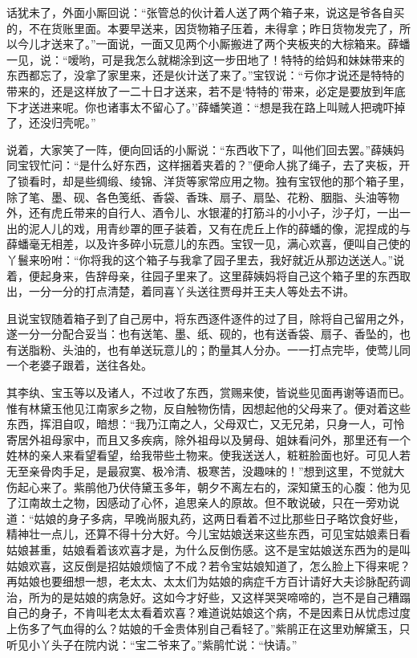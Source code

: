话犹未了，外面小厮回说：``张管总的伙计着人送了两个箱子来，说这是爷各自买的，不在货账里面。本要早送来，因货物箱子压着，未得拿；昨日货物发完了，所以今儿才送来了。''一面说，一面又见两个小厮搬进了两个夹板夹的大棕箱来。薛蟠一见，说：``嗳哟，可是我怎么就糊涂到这一步田地了！特特的给妈和妹妹带来的东西都忘了，没拿了家里来，还是伙计送了来了。''宝钗说：``亏你才说还是特特的带来的，还是这样放了一二十日才送来，若不是`特特的'带来，必定是要放到年底下才送进来呢。你也诸事太不留心了。''薛蟠笑道：``想是我在路上叫贼人把魂吓掉了，还没归壳呢。''

说着，大家笑了一阵，便向回话的小厮说：``东西收下了，叫他们回去罢。''薛姨妈同宝钗忙问：``是什么好东西，这样捆着夹着的？''便命人挑了绳子，去了夹板，开了锁看时，却是些绸缎、绫锦、洋货等家常应用之物。独有宝钗他的那个箱子里，除了笔、墨、砚、各色笺纸、香袋、香珠、扇子、扇坠、花粉、胭脂、头油等物外，还有虎丘带来的自行人、酒令儿、水银灌的打筋斗的小小子，沙子灯，一出一出的泥人儿的戏，用青纱罩的匣子装着，又有在虎丘上作的薛蟠的像，泥捏成的与薛蟠毫无相差，以及许多碎小玩意儿的东西。宝钗一见，满心欢喜，便叫自己使的丫鬟来吩咐：``你将我的这个箱子与我拿了园子里去，我好就近从那边送送人。''说着，便起身来，告辞母亲，往园子里来了。这里薛姨妈将自己这个箱子里的东西取出，一分一分的打点清楚，着同喜丫头送往贾母并王夫人等处去不讲。

且说宝钗随着箱子到了自己房中，将东西逐件逐件的过了目，除将自己留用之外，遂一分一分配合妥当：也有送笔、墨、纸、砚的，也有送香袋、扇子、香坠的，也有送脂粉、头油的，也有单送玩意儿的；酌量其人分办。一一打点完毕，使莺儿同一个老婆子跟着，送往各处。

其李纨、宝玉等以及诸人，不过收了东西，赏赐来使，皆说些见面再谢等语而已。惟有林黛玉他见江南家乡之物，反自触物伤情，因想起他的父母来了。便对着这些东西，挥泪自叹，暗想：``我乃江南之人，父母双亡，又无兄弟，只身一人，可怜寄居外祖母家中，而且又多疾病，除外祖母以及舅母、姐妹看问外，那里还有一个姓林的亲人来看望看望，给我带些土物来。使我送送人，粧粧脸面也好。可见人若无至亲骨肉手足，是最寂寞、极冷清、极寒苦，没趣味的！''想到这里，不觉就大伤起心来了。紫鹃他乃伏侍黛玉多年，朝夕不离左右的，深知黛玉的心腹：他为见了江南故土之物，因感动了心怀，追思亲人的原故。但不敢说破，只在一旁劝说道：``姑娘的身子多病，早晚尚服丸药，这两日看着不过比那些日子略饮食好些，精神壮一点儿，还算不得十分大好。今儿宝姑娘送来这些东西，可见宝姑娘素日看姑娘甚重，姑娘看着该欢喜才是，为什么反倒伤感。这不是宝姑娘送东西为的是叫姑娘欢喜，这反倒是招姑娘烦恼了不成？若令宝姑娘知道了，怎么脸上下得来呢？再姑娘也要细想一想，老太太、太太们为姑娘的病症千方百计请好大夫诊脉配药调治，所为的是姑娘的病急好。这如今才好些，又这样哭哭啼啼的，岂不是自己糟蹋自己的身子，不肯叫老太太看着欢喜？难道说姑娘这个病，不是因素日从忧虑过度上伤多了气血得的么？姑娘的千金贵体别自己看轻了。''紫鹃正在这里劝解黛玉，只听见小丫头子在院内说：``宝二爷来了。''紫鹃忙说：``快请。''


